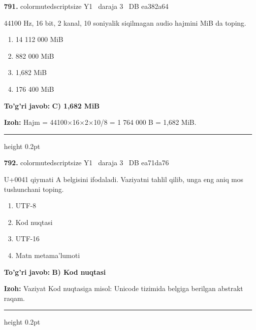 \documentclass[10pt,a4paper,oneside]{article}
\begin{document}
\noindent\textbf{\color{ink}791.}  {color{muted}scriptsize Y1 \textbullet\ daraja 3 \textbullet\ DB ea382a64}
\par
44100 Hz, 16 bit, 2 kanal, 10 soniyalik siqilmagan audio hajmini MiB da toping.
\begin{enumerate}[label=\Alph*),leftmargin=9mm]
\item 14 112 000 MiB
\item 882 000 MiB
\item 1,682 MiB
\item 176 400 MiB
\end{enumerate}
\begin{tcolorbox}[enhanced,breakable,colback=teal!4,colframe=teal!50!black,boxrule=0.5pt,arc=1.1mm,left=3mm,right=3mm,top=1.7mm,bottom=1.7mm,before skip=2mm,after skip=2mm]
\textbf{\color{teal}To'g'ri javob:} \textbf{C) 1,682 MiB}
\par\smallskip
\textbf{Izoh:} Hajm = 44100\ensuremath{\times}16\ensuremath{\times}2\ensuremath{\times}10/8 = 1 764 000 B = 1,682 MiB.
\end{tcolorbox}
\vspace{2mm}\hrule height 0.2pt \vspace{3mm}

\noindent\textbf{\color{ink}792.}  {color{muted}scriptsize Y1 \textbullet\ daraja 3 \textbullet\ DB ea71da76}
\par
U+0041 qiymati A belgisini ifodaladi. Vaziyatni tahlil qilib, unga eng aniq mos tushunchani toping.
\begin{enumerate}[label=\Alph*),leftmargin=9mm]
\item UTF-8
\item Kod nuqtasi
\item UTF-16
\item Matn metama'lumoti
\end{enumerate}
\begin{tcolorbox}[enhanced,breakable,colback=teal!4,colframe=teal!50!black,boxrule=0.5pt,arc=1.1mm,left=3mm,right=3mm,top=1.7mm,bottom=1.7mm,before skip=2mm,after skip=2mm]
\textbf{\color{teal}To'g'ri javob:} \textbf{B) Kod nuqtasi}
\par\smallskip
\textbf{Izoh:} Vaziyat Kod nuqtasiga misol: Unicode tizimida belgiga berilgan abstrakt raqam.
\end{tcolorbox}
\vspace{2mm}\hrule height 0.2pt \vspace{3mm}
\end{document}
